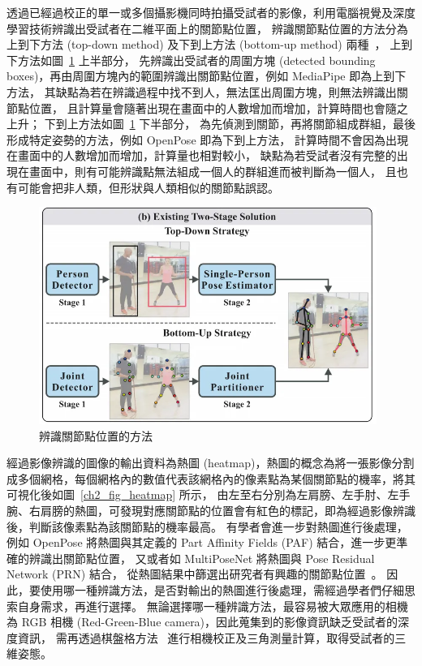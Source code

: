 透過已經過校正的單一或多個攝影機同時拍攝受試者的影像，利用電腦視覺及深度學習技術辨識出受試者在二維平面上的關節點位置，
辨識關節點位置的方法分為上到下方法 (top-down method) 及下到上方法 (bottom-up method) 兩種~\cite{nie2019single}，
上到下方法如圖~\ref{ch2_fig_topvsbottom} 上半部分，
先辨識出受試者的周圍方塊 (detected bounding boxes)，再由周圍方塊內的範圍辨識出關節點位置，例如 MediaPipe 即為上到下方法，
其缺點為若在辨識過程中找不到人，無法匡出周圍方塊，則無法辨識出關節點位置，
且計算量會隨著出現在畫面中的人數增加而增加，計算時間也會隨之上升；
下到上方法如圖~\ref{ch2_fig_topvsbottom} 下半部分，
為先偵測到關節，再將關節組成群組，最後形成特定姿勢的方法，例如 OpenPose 即為下到上方法，
計算時間不會因為出現在畫面中的人數增加而增加，計算量也相對較小，
缺點為若受試者沒有完整的出現在畫面中，則有可能辨識點無法組成一個人的群組進而被判斷為一個人，
且也有可能會把非人類，但形狀與人類相似的關節點誤認。

\begin{figure}[!ht]
    \centering
    \includegraphics[width=11cm]{figure/ch2_fig_topvsbottom.png}
     \caption[辨識關節點位置的方法 ~\cite{nie2019single}]{辨識關節點位置的方法 ~\cite{nie2019single}}
     \label{ch2_fig_topvsbottom}
\end{figure}

經過影像辨識的圖像的輸出資料為熱圖 (heatmap)，熱圖的概念為將一張影像分割成多個網格，每個網格內的數值代表該網格內的像素點為某個關節點的機率，將其可視化後如圖~\ref{ch2_fig_heatmap} 所示，
由左至右分別為左肩膀、左手肘、左手腕、右肩膀的熱圖，可發現對應關節點的位置會有紅色的標記，即為經過影像辨識後，判斷該像素點為該關節點的機率最高。
有學者會進一步對熱圖進行後處理，例如 OpenPose 將熱圖與其定義的 Part Affinity Fields (PAF) 結合，進一步更準確的辨識出關節點位置，
又或者如 MultiPoseNet 將熱圖與 Pose Residual Network (PRN) 結合，
從熱圖結果中篩選出研究者有興趣的關節點位置~\cite{kocabas2018multiposenet}。
因此，要使用哪一種辨識方法，是否對輸出的熱圖進行後處理，需經過學者們仔細思索自身需求，再進行選擇。
無論選擇哪一種辨識方法，最容易被大眾應用的相機為 RGB 相機 (Red-Green-Blue camera)，因此蒐集到的影像資訊缺乏受試者的深度資訊，
需再透過棋盤格方法~\cite{zhang1999flexible} 進行相機校正及三角測量計算，取得受試者的三維姿態。

